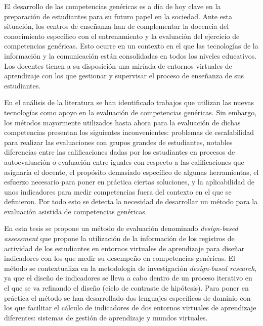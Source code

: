 


\begin{resumen}        %


El desarrollo de las competencias genéricas es a día de hoy clave en la preparación de estudiantes para su futuro papel en la sociedad. Ante esta situación, los centros de enseñanza han de complementar la docencia del conocimiento específico con el entrenamiento y la evaluación del ejercicio de competencias genéricas. Esto ocurre en un contexto en el que las tecnologías de la información y la comunicación están consolidadas en todos los niveles educativos. Los docentes tienen a su disposición una miríada de entornos virtuales de aprendizaje con los que gestionar y supervisar el proceso de enseñanza de sus estudiantes.

En el análisis de la literatura se han identificado trabajos que utilizan las nuevas tecnologías como apoyo en la evaluación de competencias genéricas. Sin embargo, los métodos mayormente utilizados hasta ahora para la evaluación de dichas competencias presentan los siguientes inconvenientes: problemas de escalabilidad para realizar las evaluaciones con grupos grandes de estudiantes, notables diferencias entre las calificaciones dadas por los estudiantes en procesos de autoevaluación o evaluación entre iguales con respecto a las calificaciones que asignaría el docente, el propósito demasiado específico de algunas herramientas, el esfuerzo necesario para poner en práctica ciertas soluciones, y la aplicabilidad de unos indicadores para medir competencias fuera del contexto en el que se definieron. Por todo esto se detecta la necesidad de desarrollar un método para la evaluación asistida de competencias genéricas.

En esta tesis se propone un método de evaluación denominado \emph{design-based assessment} que propone la utilización de la información de los registros de actividad de los estudiantes en entornos virtuales de aprendizaje para diseñar indicadores con los que medir su desempeño en competencias genéricas. El método se contextualiza en la metodología de investigación \emph{design-based research}, ya que el diseño de indicadores se lleva a cabo dentro de un proceso iterativo en el que se va refinando el diseño (ciclo de contraste de hipótesis). Para poner en práctica el método se han desarrollado dos lenguajes específicos de dominio con los que facilitar el cálculo de indicadores de dos entornos virtuales de aprendizaje diferentes: sistemas de gestión de aprendizaje y mundos virtuales.


\end{resumen}
